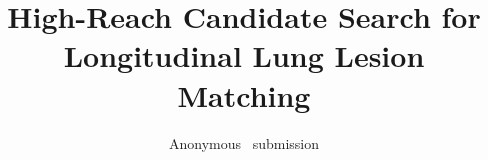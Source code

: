 \documentclass[10pt,twocolumn,letterpaper]{article}
\title{High-Reach Candidate Search for Longitudinal Lung Lesion Matching}
\author{Anonymous \confName~submission}
\begin{document}


{
    \FloatBarrier\small
    
    
}
\end{document}
